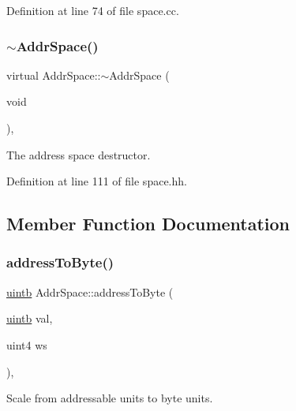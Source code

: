 Definition at line 74 of file space.\+cc.

\mbox{\label{class_addr_space_acb16b4237b6fdfd311f9fd6f96252613}} 
\subsubsection{\texorpdfstring{$\sim$AddrSpace()}{~AddrSpace()}}
{\footnotesize\ttfamily virtual Addr\+Space\+::$\sim$\+Addr\+Space (\begin{DoxyParamCaption}\item[{void}]{ }\end{DoxyParamCaption})\hspace{0.3cm}{\ttfamily [inline]}, {\ttfamily [virtual]}}



The address space destructor. 



Definition at line 111 of file space.\+hh.



\subsection{Member Function Documentation}
\mbox{\label{class_addr_space_af5925a4ae67a290f59bf17533fac62b4}} 
\subsubsection{\texorpdfstring{addressToByte()}{addressToByte()}}
{\footnotesize\ttfamily \mbox{\hyperlink{types_8h_a2db313c5d32a12b01d26ac9b3bca178f}{uintb}} Addr\+Space\+::address\+To\+Byte (\begin{DoxyParamCaption}\item[{\mbox{\hyperlink{types_8h_a2db313c5d32a12b01d26ac9b3bca178f}{uintb}}}]{val,  }\item[{uint4}]{ws }\end{DoxyParamCaption})\hspace{0.3cm}{\ttfamily [inline]}, {\ttfamily [static]}}



Scale from addressable units to byte units. 

